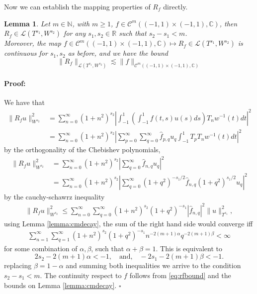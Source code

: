 \documentclass{article}
\newtheorem{lemma}[theorem]{Lemma}
\newenvironment{proof}{\paragraph{Proof:}}{\hfill$\square$}
\newcommand{\IC}{{\mathbb C}}
\newcommand{\IN}{{\mathbb N}}
\newcommand{\IR}{{\mathbb R}}
\newcommand{\cmspace}[3]{\mathcal{C}^{#1} \left( #2, #3 \right)}
\newcommand{\iinterv}{(-1,1)\times(-1,1)}
\begin{document}
Now we can establish the mapping properties of $R_f$ directly. 
\begin{lemma}
\label{lemma:Rfoperator}
Let $m \in \IN$, with $m\geq 1$, $f \in \cmspace{m}{\iinterv}{\IC}$, then $R_f \in \mathcal{L}(T^{s_1}, W^{s_2})$ for any $s_1,s_2 \in \IR$ such that $s_2 -s_1 < m$.\\  Moreover, the map $f \in \cmspace{m}{\iinterv}{\IC} \mapsto R_f \in \mathcal{L}(T^{s_1}, W^{s_2})$ is continuous for $s_1, s_2$ as before, and we have the bound 
$$
\| R_f \|_{\mathcal{L}(T^{s_1}, W^{s_2})} \lesssim \| f\|_{\cmspace{m}{\iinterv}{\IC}}
$$
\end{lemma}
\begin{proof}
We have that 
\begin{align*}
\|R_fu\|_{W^{s_2}}^2  &= \sum_{n=0}^\infty (1+n^2)^{s_2} \left\vert 
\int_{-1}^1 \left( \int_{-1}^1 f(t,s) u(s) ds\right) T_n w^{-1}(t) dt\right\vert^2\\
& = 
\sum_{n=0}^\infty (1+n^2)^{s_2} \left\vert  \sum_{p=0}^\infty \sum_{q=0}^\infty \widehat{f}_{p,q} u_q
\int_{-1}^1 T_p   T_n w^{-1}(t) dt \right\vert^2
\end{align*} 
by the orthogonality of the Chebishev polynomials,
 \begin{align*}
\|R_fu\|_{W^{s_2}}^2  &=
\sum_{n=0}^\infty (1+n^2)^{s_2} \left\vert   \sum_{q=0}^\infty \widehat{f}_{n,q} u_q
 \right\vert^2 
 \\
 &= 
\sum_{n=0}^\infty (1+n^2)^{s_2} \left\vert   \sum_{q=0}^\infty (1+q^2)^{-s_1/2}\widehat{f}_{n,q} (1 +q^2)^{s_1/2}u_q
 \right\vert^2  
\end{align*} 
by the cauchy-schawrz inequality 
\begin{align}
\label{eq:rfbound}
\|R_fu\|_{W^{s_2}}^2  \leq 
\sum_{n=0}^\infty \sum_{q=0}^\infty (1+n^2)^{s_2}     (1+q^2)^{-s_1}|\widehat{f}_{n,q}|^2  \| u\|^2_{T^{s_1}},
\end{align}
using Lemma \ref{lemma:cmdecay}, the sum of the right hand side would converge iff
\begin{align*}
\sum_{n=1}^\infty \sum_{q=1}^\infty (1+n^2)^{s_2}     (1+q^2)^{-s_1} n^{-2(m+1)\alpha} q^{-2(m+1)\beta} < \infty
\end{align*}
for some combination of $\alpha,\beta$, such that $\alpha + \beta = 1$. This is equivalent to 
$$2s_2 -2(m+1)\alpha < -1, \quad \text{and,} \quad -2s_1 -2(m+1)\beta < -1. $$
replacing $\beta = 1 - \alpha$ and summing both inequalities we arrive to the condition $s_2-s_1 < m$.  The continuity respect to $f$ follows from   \eqref{eq:rfbound} and the bounds on Lemma \ref{lemma:cmdecay}.
\end{proof}
\end{document}
